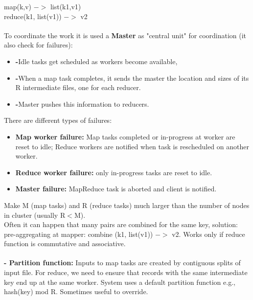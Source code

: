 \documentclass{article}
\begin{document}
map(k,v) $->$ list(k1,v1)\\
reduce(k1, list(v1)) $->$ v2\\\\
To coordinate the work it is used a \textbf{Master} as "central unit" for coordination (it also check for failures):\\
\begin{itemize}
\item \textbf{-}Idle tasks get scheduled as workers become available, 
\item \textbf{-}When a map task completes, it sends the master the location and sizes of its R intermediate files, one for each reducer.
\item \textbf{-}Master pushes this information to reducers.
\end{itemize} 
There are different types of failures:\\
\begin{itemize}
\item \textbf{Map worker failure: }Map tasks completed or in-progress at worker are reset to idle; Reduce workers are notified when task is rescheduled on another worker.
\item \textbf{Reduce worker failure: }only in-progress tasks are reset to idle.
\item \textbf{Master failure: }MapReduce task is aborted and client is notified.
\end{itemize}
Make M (map tasks) and R (reduce tasks) much larger than the number of nodes in cluster (usually R$<$M).\\
Often it can happen that many pairs are combined for the same key, solution: pre-aggregating at mapper: combine (k1, list(v1)) $->$ v2.  Works only if reduce function is commutative and associative.\\\\
\textbf{- Partition function: }Inputs to map tasks are created by contiguous splits of input file. For reduce, we need to ensure that records with the same
intermediate key end up at the same worker. System uses a default partition function e.g., hash(key) mod R. Sometimes useful to override.\\
\end{document}
